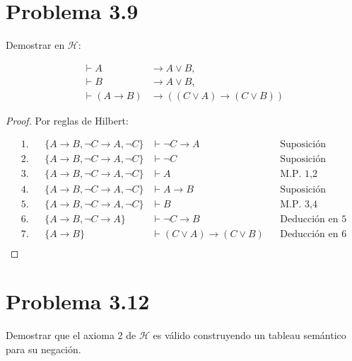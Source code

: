 \documentclass[letterpaper,12pt]{memoir}
\theoremstyle{definition}
\begin{document}
\section*{Problema 3.9}

Demostrar en  \(\mathcal{H}\):

\begin{align*}
    \vdash A & \rightarrow  A \lor B, \\
    \vdash B & \rightarrow A \lor B, \\
    \vdash (A \rightarrow B) & \rightarrow ((C \lor A) \rightarrow (C \lor B))
\end{align*}

\begin{proof}
  Por reglas de Hilbert:\\
  \noindent

  \begin{align*}
    1. &  & \{A \rightarrow B, \neg C \rightarrow A, \neg C \} &\vdash \neg C \rightarrow A & & \text{Suposición}\\
    2. & & \{A \rightarrow B, \neg C \rightarrow A, \neg C \} &\vdash \neg C & & \text{Suposición}\\ 
    3. & & \{A \rightarrow B, \neg C \rightarrow A, \neg C \} &\vdash A & & \text{M.P. 1,2}\\
    4. & & \{A \rightarrow B, \neg C \rightarrow A, \neg C \} &\vdash A \rightarrow B & & \text{Suposición}\\
    5. & & \{A \rightarrow B, \neg C \rightarrow A, \neg C \} &\vdash B & & \text{M.P. 3,4}\\
    6. & & \{A \rightarrow B, \neg C \rightarrow A\} &\vdash \neg C \rightarrow B & & \text{Deducción en 5}\\
    7. & & \{A \rightarrow B\} &\vdash (C \lor A) \rightarrow (C \lor B) & & \text{Deducción en 6}\\
  \end{align*}
\end{proof}

\section*{Problema 3.12}

Demostrar que el axioma 2 de \(\mathcal{H}\) es válido construyendo un tableau semántico para su negación.
\end{document}
